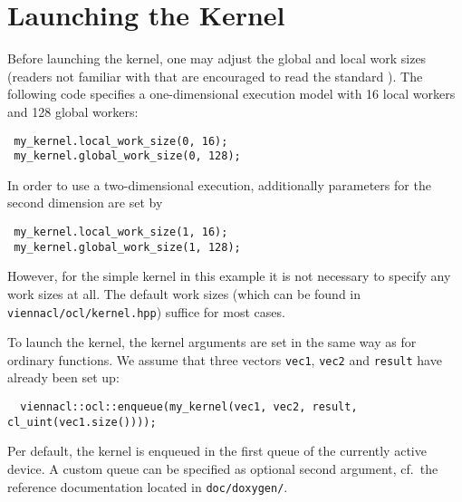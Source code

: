 \section{Launching the {\OpenCL} Kernel}
Before launching the kernel, one may adjust the global and local work sizes (readers not familiar with that are encouraged to read the {\OpenCL} standard \cite{khronoscl}).
The following code specifies a one-dimensional execution model with 16 local workers and 128 global workers:
\begin{lstlisting}
 my_kernel.local_work_size(0, 16);
 my_kernel.global_work_size(0, 128);
\end{lstlisting}
In order to use a two-dimensional execution, additionally parameters for the second dimension are set by
\begin{lstlisting}
 my_kernel.local_work_size(1, 16);
 my_kernel.global_work_size(1, 128);
\end{lstlisting}
However, for the simple kernel in this example it is not necessary to specify any work sizes at all. The default work sizes (which can be found in \texttt{viennacl/ocl/kernel.hpp}) suffice for most cases.

To launch the kernel, the kernel arguments are set in the same way as for ordinary functions.
We assume that three {\ViennaCL} vectors \lstinline|vec1|, \lstinline|vec2| and \lstinline|result| have already been set up:
\begin{lstlisting}
  viennacl::ocl::enqueue(my_kernel(vec1, vec2, result, cl_uint(vec1.size())));
\end{lstlisting}
Per default, the kernel is enqueued in the first queue of the currently active device. A custom queue can be specified as optional second argument, cf.~the reference documentation
located in \texttt{doc/doxygen/}.

